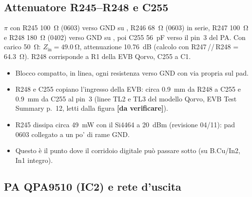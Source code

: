 \documentclass[a4paper,10pt]{article}
\newcommand{\net}[1]{\texttt{\detokenize{#1}}}
\newcommand{\dv}{\textcolor{verfr}{\textbf{[da verificare]}}}
\newcounter{regola}
\begin{document}
\subsection{Attenuatore R245--R248 e C255}
\label{sec:att}
$\pi$ con R245 \SI{100}{\ohm} (0603) verso GND su \net{RF_ATT_IN}, R246 \SI{68}{\ohm} (0603) in serie,
R247 \SI{100}{\ohm} e R248 \SI{180}{\ohm} (0402) verso GND su \net{RF_ATT_OUT}, poi C255 \SI{56}{pF} verso il
pin~3 del PA. Con carico \SI{50}{\ohm}: $Z_\mathrm{in}=\SI{49.0}{\ohm}$, attenuazione \SI{10.76}{dB}
(calcolo con R247\,//\,R248 = \SI{64.3}{\ohm}). R248 corrisponde a R1 della EVB Qorvo, C255 a C1.

\begin{regola}[attenuatore]
\begin{itemize}
\item Blocco compatto, in linea, ogni resistenza verso GND con via propria sul pad.
\item R248 e C255 copiano l'ingresso della EVB: circa \SI{0.9}{mm} da R248 a C255 e \SI{0.9}{mm} da C255 al
      pin~3 (linee TL2 e TL3 del modello Qorvo, EVB Test Summary p.~12, letti dalla figura \dv).
\item R245 dissipa circa \SI{49}{mW} con il Si4464 a \SI{+20}{dBm} (revisione 04/11): pad 0603 collegato
      a un po' di rame GND.
\item Questo è il punto dove il corridoio digitale può passare sotto (su B.Cu/In2, In1 integro).
\end{itemize}
\end{regola}

\subsection{PA QPA9510 (IC2) e rete d'uscita}
\label{sec:pa}
\end{document}
